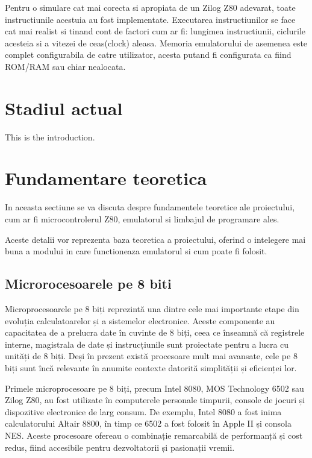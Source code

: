 \documentclass[titlepage,12pt]{article}
\begin{document}
    Pentru o simulare cat mai corecta si apropiata de un Zilog Z80 adevarat, toate instructiunile acestuia au fost implementate.
    Executarea instructiunilor se face cat mai realist si tinand cont de factori cum ar fi: lungimea instructiunii, ciclurile acesteia si a vitezei de ceas(clock) aleasa.
    Memoria emulatorului de asemenea este complet configurabila de catre utilizator, acesta putand fi configurata ca fiind \ac {ROM}/\ac {RAM} sau chiar nealocata.


    \section{Stadiul actual}
    This is the introduction.


    \section{Fundamentare teoretica}
    In aceasta sectiune se va discuta despre fundamentele teoretice ale proiectului, cum ar fi microcontrolerul Z80, emulatorul si limbajul de programare ales.

    Aceste detalii vor reprezenta baza teoretica a proiectului, oferind o intelegere mai buna a modului in care functioneaza emulatorul si cum poate fi folosit.

    \subsection{Microrocesoarele pe 8 biti}

    Microprocesoarele pe 8 biți reprezintă una dintre cele mai importante etape din evoluția calculatoarelor și a sistemelor electronice. Aceste componente au capacitatea de a prelucra date în cuvinte de 8 biți, ceea ce înseamnă că registrele interne, magistrala de date și instrucțiunile sunt proiectate pentru a lucra cu unități de 8 biți. Deși în prezent există procesoare mult mai avansate, cele pe 8 biți sunt încă relevante în anumite contexte datorită simplității și eficienței lor.

    Primele microprocesoare pe 8 biți, precum Intel 8080, MOS Technology 6502 sau Zilog Z80, au fost utilizate în computerele personale timpurii, console de jocuri și dispozitive electronice de larg consum. De exemplu, Intel 8080 a fost inima calculatorului Altair 8800, în timp ce 6502 a fost folosit în Apple II și consola NES. Aceste procesoare ofereau o combinație remarcabilă de performanță și cost redus, fiind accesibile pentru dezvoltatorii și pasionații vremii.
\end{document}
